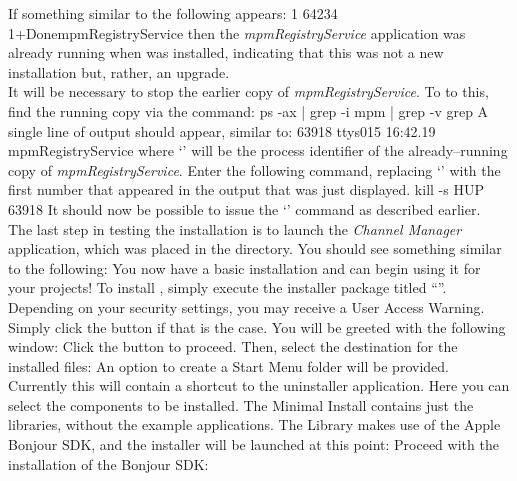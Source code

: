 If something similar to the following appears:
\outputBegin{}
\openSq{}1\closeSq{} 64234\\
\openSq{}1\closeSq{}+\hspace*{1em}Done\hspace*{8em}mpmRegistryService
\outputEnd{}
then the \emph{mpmRegistryService} application was already running when \mplusm{} was
installed, indicating that this was not a new installation but, rather, an upgrade.\\

It will be necessary to stop the earlier copy of \emph{mpmRegistryService}.
To to this, find the running copy via the command:
\outputBegin{}
ps -ax | grep -i mpm | grep -v grep
\outputEnd{}
A single line of output should appear, similar to:
\outputBegin{}
63918 ttys015   16:42.19 mpmRegistryService
\outputEnd{}
where `' will be the process identifier of the already--running copy of
\emph{mpmRegistryService}.
Enter the following command, replacing `' with the first number that
appeared in the output that was just displayed.
\outputBegin{}
kill -s HUP 63918
\outputEnd{}
It should now be possible to issue the `' command as
described earlier.\\

The last step in testing the \mplusm{} installation is to launch the
\emph{Channel Manager} application, which was placed in the 
directory.
You should see something similar to the following:
You now have a basic \mplusm{} installation and can begin using it for your projects!
\tertiaryEnd{}
\secondaryEnd{}
\newpage
{}
To install \mplusm, simply execute the installer package titled
``''.
Depending on your security settings, you may receive a User Access Warning.
Simply click the  button if that is the case.
You will be greeted with the following window:
Click the  button to proceed.
\newpage
Then, select the destination for the installed files:
An option to create a Start Menu folder will be provided.
Currently this will contain a shortcut to the uninstaller application.
\newpage
Here you can select the components to be installed.
The Minimal Install contains just the libraries, without the example applications.
The \mplusm{} Library makes use of the Apple Bonjour SDK, and the installer will be
launched at this point:
\newpage
Proceed with the installation of the Bonjour SDK:


